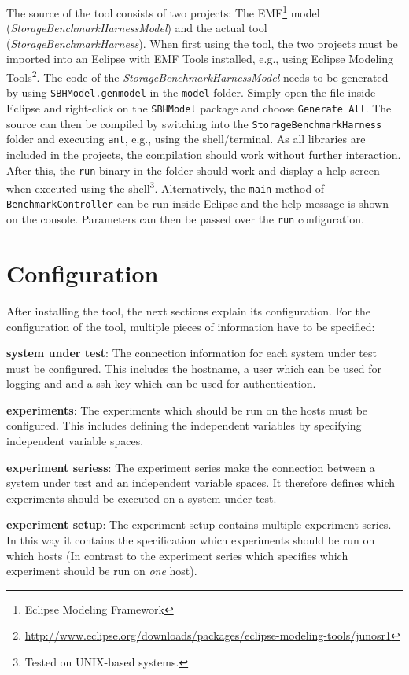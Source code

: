 The source of the tool consists of two projects: The EMF\footnote{Eclipse
Modeling Framework} model (\textit{StorageBenchmarkHarnessModel}) and the actual
tool (\textit{StorageBenchmarkHarness}). When first using the tool, the two projects must be imported into an Eclipse with EMF Tools installed, e.g., using Eclipse Modeling Tools\footnote{\url{http://www.eclipse.org/downloads/packages/eclipse-modeling-tools/junosr1}}.
The code of the \textit{StorageBenchmarkHarnessModel} needs 
to be generated by using \texttt{SBHModel.genmodel} in the \texttt{model} folder. 
Simply open the file inside Eclipse and right-click on the \texttt{SBHModel} package and choose \texttt{Generate All}. The source can then be compiled by switching into the
\texttt{StorageBenchmarkHarness} folder and executing \texttt{ant}, e.g., using the shell/terminal. As all
libraries are included in the projects, the compilation should work without
further interaction. After this, the \texttt{run} binary in the folder should
work and display a help screen when executed using the shell\footnote{Tested on UNIX-based systems.}. Alternatively, the \texttt{main} method of \texttt{BenchmarkController} can be run inside Eclipse and the help message is shown on the console. Parameters can then be passed over the \texttt{run} configuration.

\chapter{Configuration}
After installing the tool, the next sections explain its configuration. For the
configuration of the tool, multiple pieces of information have to be specified:

\begin{itemize*}
    \item \textbf{\Gls{system under test}}: The connection information for each system
        under test must be configured. This includes the hostname, a user which
        can be used for logging and and a ssh-key which can be used for
        authentication.

    \item \textbf{\Glspl{experiment}}: The experiments which should be run on the hosts
        must be configured. This includes defining the independent variables by
        specifying independent variable spaces.

    \item \textbf{\Glspl{experiment series}}: The experiment series make the connection
        between a system under test and an independent variable spaces. It
        therefore defines which experiments should be executed on a system
        under test.

    \item \textbf{\Gls{experiment setup}}: The experiment setup contains multiple
        experiment series. In this way it contains the specification which
        experiments should be run on which hosts (In contrast to the experiment
        series which specifies which experiment should be run on \textit{one}
        host).
\end{itemize*}

